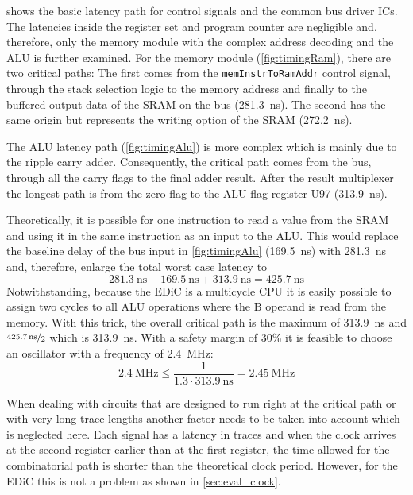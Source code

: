  shows the basic latency path for control signals and the common bus driver \glspl{IC}.
The latencies inside the register set and program counter are negligible and, therefore, only the memory module with the complex address decoding and the \gls{ALU} is further examined.
For the memory module (\cref{fig:timingRam}), there are two critical paths:
The first comes from the \texttt{memInstrToRamAddr} control signal, through the stack selection logic to the memory address and finally to the buffered output data of the \gls{SRAM} on the bus (\qty{281.3}{\nano\second}).
The second has the same origin but represents the writing option of the \gls{SRAM} (\qty{272.2}{\nano\second}).

The \gls{ALU} latency path (\cref{fig:timingAlu}) is more complex which is mainly due to the ripple carry adder.
Consequently, the critical path comes from the bus, through all the carry flags to the final adder result.
After the result multiplexer the longest path is from the zero flag to the \gls{ALU} flag register U97 (\qty{313.9}{\nano\second}).

Theoretically, it is possible for one instruction to read a value from the \gls{SRAM} and using it in the same instruction as an input to the \gls{ALU}.
This would replace the baseline delay of the bus input in \cref{fig:timingAlu} (\qty{169.5}{\nano\second}) with \qty{281.3}{\nano\second} and, therefore, enlarge the total worst case latency to
\begin{equation}
  \qty{281.3}{\nano\second}-\qty{169.5}{\nano\second}+\qty{313.9}{\nano\second}=\qty{425.7}{\nano\second}\label{eq:latency}
\end{equation}
Notwithstanding, because the \gls{EDiC} is a multicycle \gls{CPU} it is easily possible to assign two cycles to all \gls{ALU} operations where the B operand is read from the memory.
With this trick, the overall critical path is the maximum of \qty{313.9}{\nano\second} and $\nicefrac{\qty{425.7}{\nano\second}}{2}$ which is \qty{313.9}{\nano\second}.
With a safety margin of 30\% it is feasible to choose an oscillator with a frequency of \qty{2.4}{\mega\hertz}:
\begin{equation}
  \qty{2.4}{\mega\hertz}\leq\frac{1}{1.3\cdot\qty{313.9}{\nano\second}} =\qty{2.45}{\mega\hertz}
\end{equation}

When dealing with circuits that are designed to run right at the critical path or with very long trace lengths another factor needs to be taken into account which is neglected here.
Each signal has a latency in traces and when the clock arrives at the second register earlier than at the first register, the time allowed for the combinatorial path is shorter than the theoretical clock period.
However, for the \gls{EDiC} this is not a problem as shown in \cref{sec:eval_clock}.

